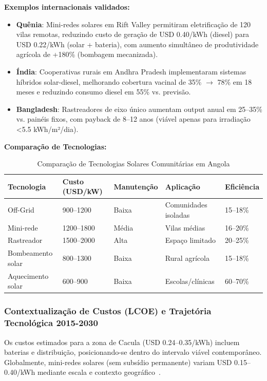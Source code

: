 \documentclass[12pt, a4paper]{article}
\begin{document}
\textbf{Exemplos internacionais validados:}
\begin{itemize}
\item \textbf{Quênia}: Mini-redes solares em Rift Valley permitiram eletrificação de 120 vilas remotas, reduzindo custo de geração de USD 0.40/kWh (diesel) para USD 0.22/kWh (solar + bateria), com aumento simultâneo de produtividade agrícola de +180\% (bombagem mecanizada)\citep{Onyango2022}. \item \textbf{Índia}: Cooperativas rurais em Andhra Pradesh implementaram sistemas híbridos solar-diesel, melhorando cobertura vacinal de 35\% $\to$ 78\% em 18 meses e reduzindo consumo diesel em 55\% vs. previsão\citep{Mapako2021}.
\item \textbf{Bangladesh}: Rastreadores de eixo único aumentam output anual em 25--35\% vs. painéis fixos, com payback de 8--12 anos (viável apenas para irradiação <5.5 kWh/m²/dia)\citep{Rahman2024}.
\end{itemize}

\textbf{Comparação de Tecnologias:}

\begin{table}[H]
\centering
\caption{Comparação de Tecnologias Solares Comunitárias em Angola}
\label{Tab:6}
\footnotesize
\begin{tabular}{|l|l|l|l|l|}
\hline
\textbf{Tecnologia} & \textbf{Custo (USD/kW)} & \textbf{Manutenção} & \textbf{Aplicação} & \textbf{Eficiência} \\
\hline
Off-Grid & 900--1200 & Baixa & Comunidades isoladas & 15--18\% \\
Mini-rede & 1200--1800 & Média & Vilas médias & 16--20\% \\
Rastreador & 1500--2000 & Alta & Espaço limitado & 20--25\% \\
Bombeamento solar & 800--1300 & Baixa & Rural agrícola & 15--18\% \\
Aquecimento solar & 600--900 & Baixa & Escolas/clínicas & 60--70\% \\
\hline
\end{tabular}
\end{table}

\subsubsection{Contextualização de Custos (LCOE) e Trajetória Tecnológica 2015-2030}

Os custos estimados para a zona de Cacula (USD 0.24--0.35/kWh) incluem baterias e distribuição, posicionando-se dentro do intervalo viável contemporâneo.
Globalmente, mini-redes solares (sem subsídio permanente) variam USD 0.15--0.40/kWh mediante escala e contexto geográfico~\citep{Ramasamy2022}.
\end{document}
